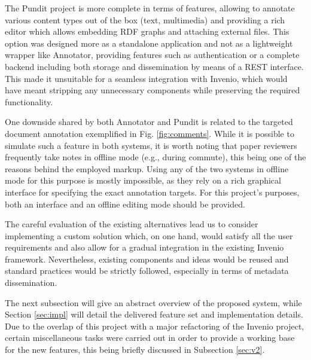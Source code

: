 The Pundit project is more complete in terms of features, allowing to annotate
various content types out of the box (text, multimedia) and providing a rich
editor which allows embedding RDF graphs and attaching external files. This
option was designed more as a standalone application and not as a lightweight
wrapper like Annotator, providing features such as authentication or a
complete backend including both storage and dissemination by means of a REST
interface.  This made it unsuitable for a seamless integration with Invenio,
which would have meant stripping any unnecessary components while preserving
the required functionality.

One downside shared by both Annotator and Pundit is related to the targeted
document annotation exemplified in Fig. \ref{fig:comments}. While it is
possible to simulate such a feature in both systems, it is worth noting that
paper reviewers frequently take notes in offline mode (e.g., during commute),
this being one of the reasons behind the employed markup. Using any of the two
systems in offline mode for this purpose is mostly impossible, as they rely on
a rich graphical interface for specifying the exact annotation targets. For
this project's purposes, both an interface and an offline editing mode should
be provided.

The careful evaluation of the existing alternatives lead us to consider
implementing a custom solution which, on one hand, would satisfy all the user
requirements and also allow for a gradual integration in the existing Invenio
framework. Nevertheless, existing components and ideas would be reused and
standard practices would be strictly followed, especially in terms of metadata
dissemination.

The next subsection will give an abstract overview of the proposed system,
while Section \ref{sec:impl} will detail the delivered feature set and
implementation details. Due to the overlap of this project with a major
refactoring of the Invenio project, certain miscellaneous tasks were carried
out in order to provide a working base for the new features, this being briefly
discussed in Subsection \ref{sec:v2}.
